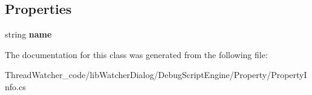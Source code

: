 \subsection*{Properties}
\begin{DoxyCompactItemize}
\item 
\hypertarget{classlib_watcher_dialog_1_1_debug_script_engine_1_1_property_1_1_property_info_a28f39b1259c4b5fcaf241eb281d4f5bb}{string {\bfseries name}}\label{classlib_watcher_dialog_1_1_debug_script_engine_1_1_property_1_1_property_info_a28f39b1259c4b5fcaf241eb281d4f5bb}

\end{DoxyCompactItemize}


The documentation for this class was generated from the following file\+:\begin{DoxyCompactItemize}
\item 
Thread\+Watcher\+\_\+code/lib\+Watcher\+Dialog/\+Debug\+Script\+Engine/\+Property/Property\+Info.\+cs\end{DoxyCompactItemize}
